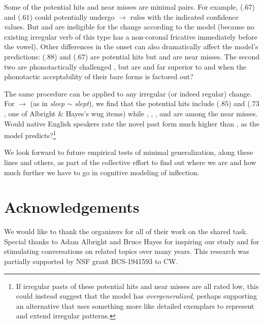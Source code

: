 \documentclass[11pt]{article}
\begin{document}
Some of the potential hits and near misses are minimal pairs. For example,  ($.67$) and  ($.61$) could potentially undergo  $\to$  rules with the indicated confidence values. But  and  are ineligible for the change according to the model (because no existing irregular verb of this type has a non-coronal fricative immediately before the vowel). Other differences in the onset can also dramatically affect the model's predictions:  ($.88$) and  ($.67$) are potential hits but  and  are near misses. The second two are phonotactically challenged \citep{davis-1989-cross}, but are  and  far superior to  and  when the phonotactic acceptability of their bare forms is factored out?

The same procedure can be applied to any irregular (or indeed regular) change. For  $\to$  (as in \emph{sleep} $\sim$ \emph{slept}), we find that the potential hits include  ($.85$) and  ($.73$, one of Albright \& Hayes's wug items) while , , , and  are among the near misses. Would native English speakers rate the novel past form  much higher than , as the model predicts?\footnote{If irregular pasts of these potential hits and near misses are all rated low, this could instead suggest that the model has \emph{overgeneralized}, perhaps supporting an alternative that uses something more like detailed exemplars to represent and extend irregular patterns.}

We look forward to future empirical tests of minimal generalization, along these lines and others, as part of the collective effort to find out where we are and how much further we have to go in cognitive modeling of inflection.


\section*{Acknowledgements}

We would like to thank the organizers for all of their work on the shared task. Special thanks to Adam Albright and Bruce Hayes for inspiring our study and for stimulating conversations on related topics over many years. This research was partially supported by NSF grant BCS-1941593 to CW.






\appendix


\end{document}
